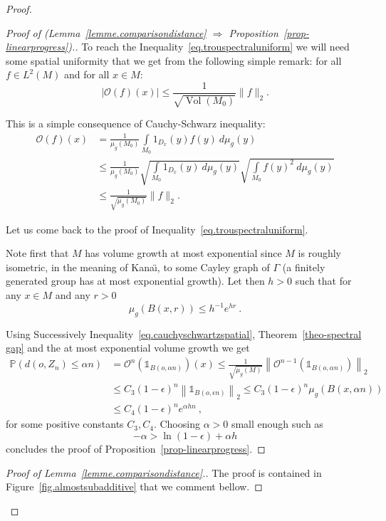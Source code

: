\documentclass[AHL,Unicode,longabstracts,published]{cedram}
\DeclareMathOperator{\Vol}{Vol}
\newcommand{\dsun}{\mathds{1}}
\newcommand{\cO}{\mathcal{O}}
\newcommand{\PP}{\mathbb{P}}
\newcommand{\inte}[1]{\underset{#1}{\int}}
\begin{document}
\begin{proof}
\begin{proof}[Proof of (Lemma~\ref{lemme.comparisondistance} $\Rightarrow$ Proposition~\ref{prop-linearprogress}).]
To reach the Inequality~\eqref{eq.trouspectraluniform} we will need some spatial uniformity that we get from the following simple remark: for all $f\in L^2(M)$ and for all $x \in M$:
\begin{equation}\label{eq.cauchyschwartzspatial}
\left|\cO(f)(x)\right| \leq \frac{1}{\sqrt{\Vol(M_0)}}\|f\|_2.
\end{equation}

This is a simple consequence of Cauchy-Schwarz inequality:
\begin{align*}
\cO (f)(x)& = \frac{1}{\mu_g(M_0)} \inte{M_0} 1_{D_x}(y) f(y) \ d \mu_g(y) \\
&\leq \frac{1}{\mu_g(M_0)} \sqrt{\inte{M_0} 1_{D_x}(y) \ d \mu_g(y)} \sqrt{ \inte{M_0} f(y)^2 \ d \mu_g(y)} \\
&\leq \frac{1}{\sqrt{\mu_g(M_0)}}\|f\|_2.
\end{align*}

Let us come back to the proof of Inequality~\eqref{eq.trouspectraluniform}. 

Note first that $M$ has volume growth at most exponential since $M$ is roughly isometric, in the meaning of Kana{\"\i}, to some Cayley graph of $\Gamma$ (a finitely generated group has at most exponential growth). Let then $h > 0$ such that for any $x \in M$ and any $r > 0$
\[
\mu_g(B(x,r)) \le h^{-1} e^{h r} \ .
\]

Using Successively Inequality~\eqref{eq.cauchyschwartzspatial}, Theorem~\ref{theo-spectral gap} and the at most exponential volume growth we get
\begin{align*}
\PP\left(d\left(o, Z_{n}\right) \leq \alpha n\right)
& = \cO^n\left(\dsun_{B(o, \alpha n)}\right)(x)  \leq \frac{1}{\sqrt{\mu_g(M)}}\left\|\cO^{n-1}\left(\dsun_{B(o, \alpha n)}\right)\right\|_2 \\
& \leq C_3(1-\epsilon)^n \left\|\dsun_{B(o, \epsilon n)}\right\|_2  \leq C_3(1-\epsilon)^n \mu_g\left(B(x, \alpha n)\right) \\
& \le C_4 (1-\epsilon)^n e^{ \alpha h n} \ ,
\end{align*}
for some positive constants $C_3, C_4$. Choosing $\alpha > 0$ small enough such as
\[
- \alpha > \ln(1 - \epsilon) + \alpha h
\]
concludes the proof of Proposition~\ref{prop-linearprogress}.
\end{proof}

\begin{proof}[Proof of Lemma~\ref{lemme.comparisondistance}.]
The proof is contained in Figure~\ref{fig.almostsubadditive} that we comment bellow.



\end{proof}
\end{proof}
\end{document}
